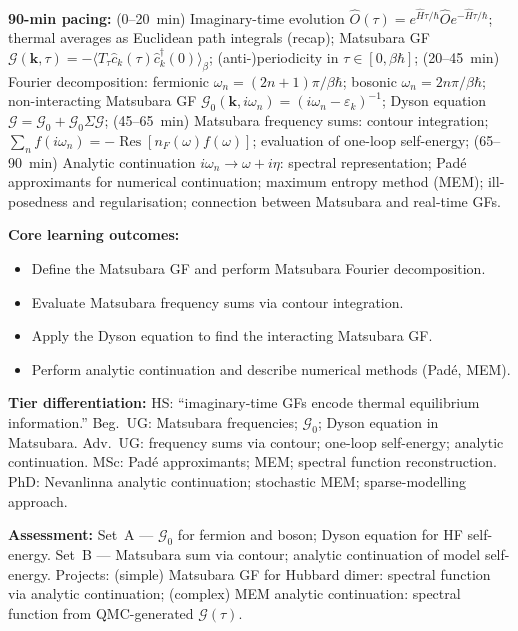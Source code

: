 \documentclass[11pt,a4paper]{article}
\begin{document}
\medskip

\begin{tcolorbox}[modulebox, title={Module~II.7 / L06: Imaginary-Time Formalism and Matsubara Green's Functions}]
\textbf{90-min pacing:} (0--20~min) Imaginary-time evolution $\hat{O}(\tau)=e^{\hat{H}\tau/\hbar}\hat{O}e^{-\hat{H}\tau/\hbar}$; thermal averages as Euclidean path integrals (recap); Matsubara GF $\mathcal{G}(\mathbf{k},\tau)=-\langle T_\tau\hat{c}_k(\tau)\hat{c}_k^\dagger(0)\rangle_\beta$; (anti-)periodicity in $\tau\in[0,\beta\hbar]$; (20--45~min) Fourier decomposition: fermionic $\omega_n=(2n+1)\pi/\beta\hbar$; bosonic $\omega_n=2n\pi/\beta\hbar$; non-interacting Matsubara GF $\mathcal{G}_0(\mathbf{k},i\omega_n)=(i\omega_n-\varepsilon_k)^{-1}$; Dyson equation $\mathcal{G}=\mathcal{G}_0+\mathcal{G}_0\Sigma\mathcal{G}$; (45--65~min) Matsubara frequency sums: contour integration; $\sum_n f(i\omega_n)=-\operatorname{Res}[n_F(\omega)f(\omega)]$; evaluation of one-loop self-energy; (65--90~min) Analytic continuation $i\omega_n\to\omega+i\eta$: spectral representation; Padé approximants for numerical continuation; maximum entropy method (MEM); ill-posedness and regularisation; connection between Matsubara and real-time GFs.

\medskip\textbf{Core learning outcomes:}
\begin{itemize}[leftmargin=1.4em,topsep=2pt,itemsep=1pt]
  \item Define the Matsubara GF and perform Matsubara Fourier decomposition.
  \item Evaluate Matsubara frequency sums via contour integration.
  \item Apply the Dyson equation to find the interacting Matsubara GF.
  \item Perform analytic continuation and describe numerical methods (Padé, MEM).
\end{itemize}

\medskip\textbf{Tier differentiation:}
HS: ``imaginary-time GFs encode thermal equilibrium information.''
Beg.\ UG: Matsubara frequencies; $\mathcal{G}_0$; Dyson equation in Matsubara.
Adv.\ UG: frequency sums via contour; one-loop self-energy; analytic continuation.
MSc: Padé approximants; MEM; spectral function reconstruction.
PhD: Nevanlinna analytic continuation; stochastic MEM; sparse-modelling approach.

\medskip\textbf{Assessment:}
Set~A --- $\mathcal{G}_0$ for fermion and boson; Dyson equation for HF self-energy.
Set~B --- Matsubara sum via contour; analytic continuation of model self-energy.
Projects: (simple) Matsubara GF for Hubbard dimer: spectral function via analytic continuation;
(complex) MEM analytic continuation: spectral function from QMC-generated $\mathcal{G}(\tau)$.
\end{tcolorbox}
\end{document}
